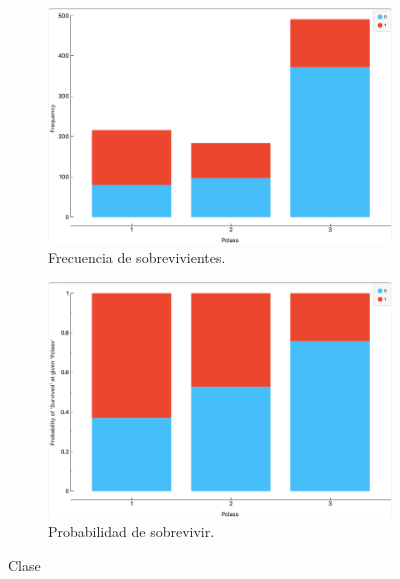 	\begin{figure}[ht]
	\begin{subfigure}{.5\textwidth}
		\includegraphics[scale=0.3]{images/2}
		\centering 
		\caption{Frecuencia de sobrevivientes.}
	\end{subfigure}
	\begin{subfigure}{.5\textwidth}
		\includegraphics[scale=0.3]{images/3}
		\centering 
		\caption{Probabilidad de sobrevivir.}
	\end{subfigure}
	\caption{Clase}
\end{figure}


